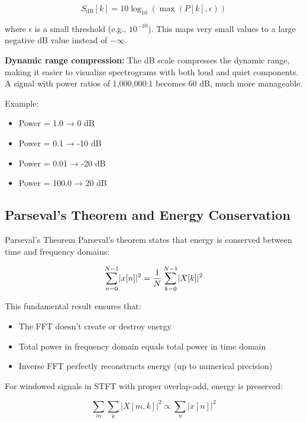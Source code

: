 \begin{equation}
  S_{\text{dB}}[k] = 10 \log_{10}(\max(P[k], \epsilon))
\end{equation}

where $\epsilon$ is a small threshold (e.g., $10^{-10}$). This maps
very small values to a large negative dB value instead of $-\infty$.

\textbf{Dynamic range compression:} The dB scale compresses the
dynamic range, making it easier to visualize spectrograms with both
loud and quiet components. A signal with power ratios of 1,000,000:1
becomes 60 dB, much more manageable.

Example:
\begin{itemize}
  \item Power = 1.0 → 0 dB
  \item Power = 0.1 → -10 dB
  \item Power = 0.01 → -20 dB
  \item Power = 100.0 → 20 dB
\end{itemize}

\subsection{Parseval's Theorem and Energy Conservation}\label{subsec:parseval}

\begin{concept}{Parseval's Theorem}
  Parseval's theorem states that energy is conserved between time and
  frequency domains:

  \begin{equation}
    \label{eq:parseval}
    \sum_{n=0}^{N-1} \lvert x[n]\rvert^2 = \frac{1}{N}\sum_{k=0}^{N-1} \lvert X[k]\rvert^2
  \end{equation}

  This fundamental result ensures that:
  \begin{itemize}[itemsep=2pt]
    \item The FFT doesn't create or destroy energy
    \item Total power in frequency domain equals total power in time domain
    \item Inverse FFT perfectly reconstructs energy (up to numerical precision)
  \end{itemize}
\end{concept}

For windowed signals in STFT with proper overlap-add, energy is preserved:

\begin{equation}
  \sum_m \sum_k |X[m,k]|^2 \propto \sum_n |x[n]|^2
\end{equation}

